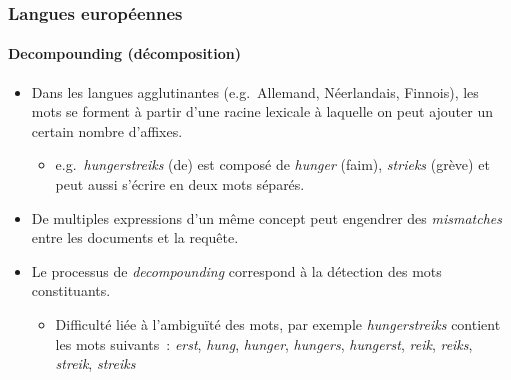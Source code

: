 \documentclass[12pt,aspectratio=43,dvipsnames,table]{beamer}
\begin{document}
\begin{frame}
    \frametitle{Langues européennes}
    \framesubtitle{Decompounding (décomposition)}
    \begin{itemize} \itemsep10pt
        \item Dans les langues agglutinantes (e.g.~Allemand, Néerlandais, 
              Finnois), les mots se forment à partir d'une racine lexicale à 
              laquelle on peut ajouter un certain nombre d'affixes.
        \begin{itemize}
            \item e.g.~\textit{hungerstreiks} (de) est composé de 
                  \textit{hunger} (faim), \textit{strieks} (grève) et peut aussi
                  s'écrire en deux mots séparés.
        \end{itemize}
        \item De multiples expressions d'un même concept peut engendrer des 
              \textit{mismatches} entre les documents et la requête.
        \item Le processus de \textit{decompounding} correspond à la détection 
              des mots constituants.
        \begin{itemize}
            \item Difficulté liée à l'ambiguïté des mots, par exemple 
                  \textit{hungerstreiks} contient les mots suivants~: 
                  \textit{erst}, \textit{hung}, \textit{hunger}, 
                  \textit{hungers}, \textit{hungerst}, \textit{reik}, 
                  \textit{reiks}, \textit{streik}, \textit{streiks}
        \end{itemize}
    \end{itemize}
\end{frame}
\end{document}
